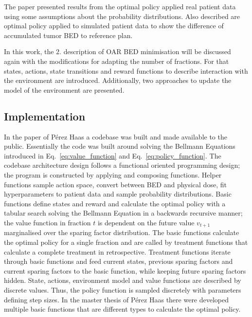 \documentclass[\relativeRoot/ada.tex]{subfiles}
\begin{document}
The paper presented results from the optimal policy applied real patient data using some assumptions about the probability distributions. Also described are optimal policy applied to simulated patient data to show the difference of accumulated tumor BED to reference plan.

In this work, the $2.$ description of OAR BED minimisation will be discussed again with the modifications for adapting the number of fractions. For that states, actions, state transitions and reward functions to describe interaction with the environment are introduced. Additionally, two approaches to update the model of the environment are presented.


\subsection{Implementation}

In the paper of Pérez Haas \cite{perezhaas_adaptive} a codebase was built and made available to the public.  Essentially the code was built around solving the Bellmann Equations introduced in Eq.~\ref{eq:value_function} and Eq.~\ref{eq:policy_function}. The codebase architecture design follows a functional oriented programming design; the program is constructed by applying and composing functions. Helper functions sample action space, convert between BED and physical dose, fit hyperparameters to patient data and sample probability distributions. Basic functions define states and reward and calculate the optimal policy with a tabular search solving the Bellmann Equation in a backwards recursive manner; the value function  in fraction $t$ is dependent on the future value $v_{t+1}$ marginalised over the sparing factor distribution. The basic functions calculate the optimal policy for a single fraction and are called by treatment functions that calculate a complete treatment in retrospective. Treatment functions iterate through basic functions and feed current states, previous sparing factors and current sparing factors to the basic function, while keeping future sparing factors hidden. State, actions, environment model and value functions are described by discrete values. Thus, the policy function is sampled discretely with parameters defining step sizes. In the master thesis of Pérez Haas \cite{perezhaas_master} there were developed multiple basic functions that are different types to calculate the optimal policy.
\end{document}
